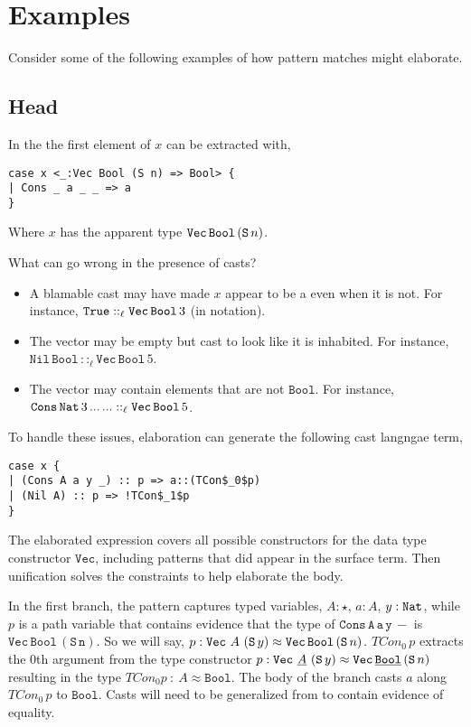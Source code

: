 \section{Examples}
 
Consider some of the following examples of how \slang{} pattern matches might elaborate.
 
\subsection{Head}
 
In the \slang{} the first element of $x$ can be extracted with,
 
\begin{lstlisting}[basicstyle={\ttfamily\small}]
case x <_:Vec Bool (S n) => Bool> {
| Cons _ a _ _ => a
}
\end{lstlisting}

Where $x$ has the apparent type $\mathtt{Vec}{}\,\mathtt{Bool}{}\,(\mathtt{S}{}\,n)$.

What can go wrong in the presence of casts?
\begin{itemize}
\item
A blamable cast may have made $x$ appear to be a \Vect{} even when it is not.
For instance, $\mathtt{True}{}::_{\ell}\mathtt{Vec}{}\,\mathtt{Bool}{}\,3$ (in  notation).
\item
The vector may be empty but cast to look like it is inhabited.
For instance, $\mathtt{Nil}\,\mathtt{Bool}\,::_{\ell}\mathtt{Vec}\,\mathtt{Bool}\,5$.
\item
The vector may contain elements that are not $\mathtt{Bool}$.
For instance, $\mathtt{Cons}\,\mathtt{Nat}{}\,3\,...\,...::_{\ell}\mathtt{Vec}\,\mathtt{Bool}\,5$.
\end{itemize}
 
To handle these issues, elaboration can generate the following cast langngae term,
 
\begin{lstlisting}[basicstyle={\ttfamily\small}]
case x {
| (Cons A a y _) :: p => a::(TCon$_0$p)
| (Nil A) :: p => !TCon$_1$p
}
\end{lstlisting}
 
The elaborated \case{} expression covers all possible constructors for the data type constructor $\mathtt{Vec}$, including patterns that did appear in the surface term.
Then unification solves the constraints to help elaborate the body.
 
In the first branch, the pattern captures typed variables, $A:\star$, $a:A$, $y:\mathtt{Nat}{}$, while $p$ is a path variable that contains evidence that the type of $\mathtt{Cons\,A\,a\,y\,-}$ is $\mathtt{Vec\,Bool\,(S\,n)}$.
So we will say, $p:\mathtt{Vec}\ A\ (\Suc{}\,y)\approx\mathtt{Vec}\,\mathtt{Bool}\,(\Suc{}\,n)$.
$TCon_{0}\,p$ extracts the 0th argument from the type constructor $p:\mathtt{Vec}\ \underline{A}\ (\Suc{}\,y)\approx\mathtt{Vec}\,\underline{\mathtt{Bool}}\,(\Suc{}\,n)$ resulting in the type $TCon_{0}p\ :\ A\approx\mathtt{Bool}$.
The body of the branch casts $a$ along $TCon_{0}\,p$ to $\mathtt{Bool}$.
Casts will need to be generalized from  to contain evidence of equality.
 
